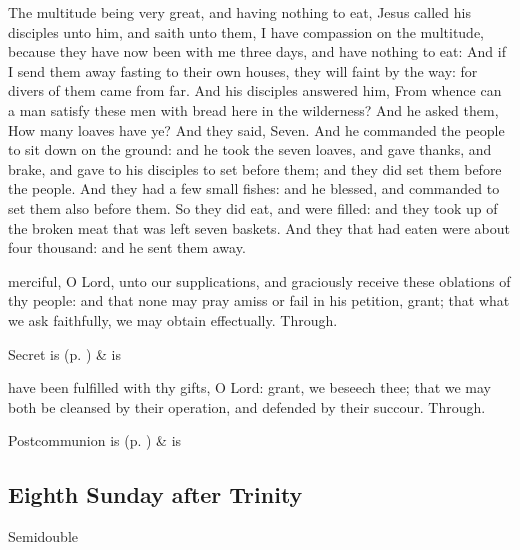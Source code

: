 \clearpage
{}
 The multitude being very great, and having nothing to eat, Jesus called his disciples unto him, and saith unto them, I have compassion on the multitude, because they have now been with me three days, and have nothing to eat: And if I send them away fasting to their own houses, they will faint by the way: for divers of them came from far. And his disciples answered him, From whence can a man satisfy these men with bread here in the wilderness? And he asked them, How many loaves have ye? And they said, Seven. And he commanded the people to sit down on the ground: and he took the seven loaves, and gave thanks, and brake, and gave to his disciples to set before them; and they did set them before the people. And they had a few small fishes: and he blessed, and commanded to set them also before them. So they did eat, and were filled: and they took up of the broken meat that was left seven baskets. And they that had eaten were about four thousand: and he sent them away.


\secret
{} merciful, O Lord, unto our supplications, and graciously receive these oblations of thy people: and that none may pray amiss or fail in his petition, grant; that what we ask faithfully, we may obtain effectually. Through.
\begin{rubric}
     Secret is  (p. \pageref{SPSaints}) \&  is 
\end{rubric}


\postcommunion
{} have been fulfilled with thy gifts, O Lord: grant, we beseech thee; that we may both be cleansed by their operation, and defended by their succour. Through.
\begin{rubric}
     Postcommunion is  (p. \pageref{SPSaints}) \&  is 
\end{rubric}


\clearpage
\subsection{Eighth Sunday after Trinity}
\begin{inhead}
    {Semidouble}
\end{inhead}

